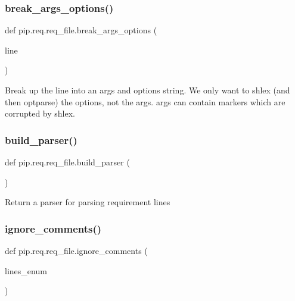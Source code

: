 \subsubsection{\texorpdfstring{break\+\_\+args\+\_\+options()}{break\_args\_options()}}
{\footnotesize\ttfamily def pip.\+req.\+req\+\_\+file.\+break\+\_\+args\+\_\+options (\begin{DoxyParamCaption}\item[{}]{line }\end{DoxyParamCaption})}

\begin{DoxyVerb}Break up the line into an args and options string.  We only want to shlex
(and then optparse) the options, not the args.  args can contain markers
which are corrupted by shlex.
\end{DoxyVerb}
 \mbox{\label{namespacepip_1_1req_1_1req__file_a2fd1f4a7059671471a6440d046283ac8}} 
\subsubsection{\texorpdfstring{build\+\_\+parser()}{build\_parser()}}
{\footnotesize\ttfamily def pip.\+req.\+req\+\_\+file.\+build\+\_\+parser (\begin{DoxyParamCaption}{ }\end{DoxyParamCaption})}

\begin{DoxyVerb}Return a parser for parsing requirement lines
\end{DoxyVerb}
 \mbox{\label{namespacepip_1_1req_1_1req__file_a4f437b109d9611da9924cfcf8c081dc9}} 
\subsubsection{\texorpdfstring{ignore\+\_\+comments()}{ignore\_comments()}}
{\footnotesize\ttfamily def pip.\+req.\+req\+\_\+file.\+ignore\+\_\+comments (\begin{DoxyParamCaption}\item[{}]{lines\+\_\+enum }\end{DoxyParamCaption})}

